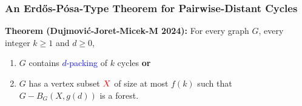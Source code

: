 \documentclass{beamer}
\begin{document}
\begin{frame}
  \frametitle{An Erdős-Pósa-Type Theorem for Pairwise-Distant Cycles}

  \noindent\textbf{Theorem (Dujmović-Joret-Micek-M 2024):} For every graph $G$, every integer $k\ge 1$ and $d\ge 0$,
  \begin{enumerate}%
    \item $G$ contains \textcolor{blue}{$d$-packing} of $k$ cycles \textbf{or}
    \item $G$ has a vertex subset $\mathcolor{red}{X}$ of size at most $f(k)$ such that $G-B_G(X,g(d))$ is a forest.  \newline {}
  \end{enumerate}


\end{frame}
\end{document}
